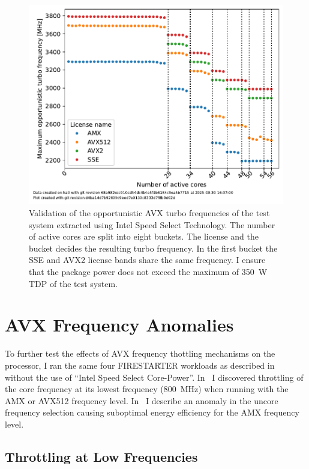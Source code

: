 \begin{figure}[]
    \centering
    \includegraphics[width=0.8\columnwidth]{fig/avx-frequency-license-bands-validation/validate-avx-frequency-license-bands.pdf}
    \caption{\label{fig:validated-p0n-frequencies}Validation of the opportunistic AVX turbo frequencies of the test system extracted using Intel Speed Select Technology.
    The number of active cores are split into eight buckets. The license and the bucket decides the resulting turbo frequency.
    In the first bucket the SSE and AVX2 license bands share the same frequency. I ensure that the package power does not exceed the maximum of \SI{350}{\watt} TDP of the test system.}
\end{figure}

\section{AVX Frequency Anomalies}
\label{sec:avx-anomalies}

To further test the effects of AVX frequency thottling mechanisms on the processor, I ran the same four FIRESTARTER workloads as described in~ without the use of ``Intel Speed Select Core-Power''.
In~ I discovered throttling of the core frequency at its lowest frequency (\SI{800}{\MHz}) when running with the AMX or AVX512 frequency level.
In~ I describe an anomaly in the uncore frequency selection causing suboptimal energy efficiency for the AMX frequency level.

\subsection{Throttling at Low Frequencies}
\label{sec:avx-anomalies-low-freq}

